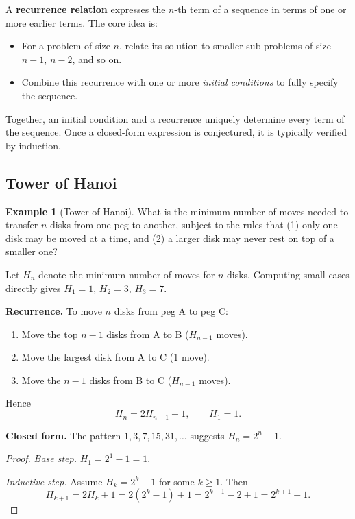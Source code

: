 \documentclass[11pt, a4paper, notitlepage]{report}
\theoremstyle{definition}
\newtheorem{example}[theorem]{Example}
\theoremstyle{remark}
\begin{document}
A \textbf{recurrence relation} expresses the $n$-th term of a sequence in terms of one or more
earlier terms.  The core idea is:

\begin{itemize}
  \item For a problem of size $n$, relate its solution to smaller sub-problems of size
        $n-1$, $n-2$, and so on.
  \item Combine this recurrence with one or more \emph{initial conditions} to fully specify
        the sequence.
\end{itemize}

Together, an initial condition and a recurrence uniquely determine every term of the sequence.
Once a closed-form expression is conjectured, it is typically verified by induction.

\subsection{Tower of Hanoi}
\label{subsec:hanoi}

\begin{example}[Tower of Hanoi]
\label{ex:hanoi}
What is the minimum number of moves needed to transfer $n$ disks from one peg to another,
subject to the rules that (1) only one disk may be moved at a time, and (2) a larger disk
may never rest on top of a smaller one?
\end{example}

Let $H_n$ denote the minimum number of moves for $n$ disks.  Computing small cases directly
gives $H_1 = 1$, $H_2 = 3$, $H_3 = 7$.

\textbf{Recurrence.}  To move $n$ disks from peg A to peg C:
\begin{enumerate}
  \item Move the top $n-1$ disks from A to B \hfill ($H_{n-1}$ moves).
  \item Move the largest disk from A to C \hfill (1 move).
  \item Move the $n-1$ disks from B to C \hfill ($H_{n-1}$ moves).
\end{enumerate}

Hence
\[
  H_n = 2H_{n-1} + 1, \qquad H_1 = 1.
\]

\textbf{Closed form.}  The pattern $1, 3, 7, 15, 31, \ldots$ suggests $H_n = 2^n - 1$.

\begin{proof}
\textit{Base step.}  $H_1 = 2^1 - 1 = 1$. \checkmark

\textit{Inductive step.}  Assume $H_k = 2^k - 1$ for some $k \geq 1$.  Then
\[
  H_{k+1} = 2H_k + 1 = 2(2^k - 1) + 1 = 2^{k+1} - 2 + 1 = 2^{k+1} - 1.
\]
\end{proof}
\end{document}
